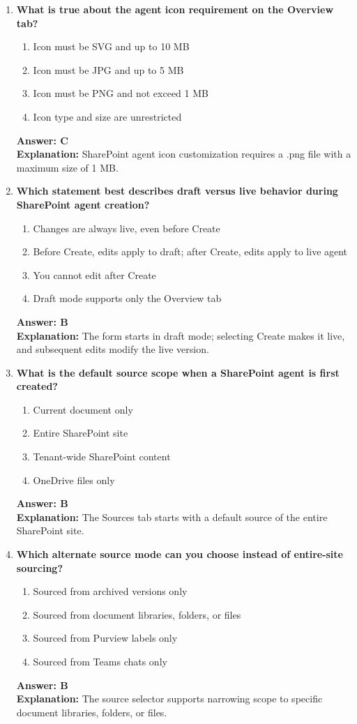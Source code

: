 \documentclass[10pt]{article}
\begin{document}
\begin{enumerate}[leftmargin=*]
\item \textbf{What is true about the agent icon requirement on the Overview tab?}
\begin{enumerate}[label=\Alph*.]
  \item Icon must be SVG and up to 10 MB
  \item Icon must be JPG and up to 5 MB
  \item Icon must be PNG and not exceed 1 MB
  \item Icon type and size are unrestricted
\end{enumerate}
\textbf{Answer: C}\\
\textbf{Explanation:} SharePoint agent icon customization requires a .png file with a maximum size of 1 MB.

\item \textbf{Which statement best describes draft versus live behavior during SharePoint agent creation?}
\begin{enumerate}[label=\Alph*.]
  \item Changes are always live, even before Create
  \item Before Create, edits apply to draft; after Create, edits apply to live agent
  \item You cannot edit after Create
  \item Draft mode supports only the Overview tab
\end{enumerate}
\textbf{Answer: B}\\
\textbf{Explanation:} The form starts in draft mode; selecting Create makes it live, and subsequent edits modify the live version.

\item \textbf{What is the default source scope when a SharePoint agent is first created?}
\begin{enumerate}[label=\Alph*.]
  \item Current document only
  \item Entire SharePoint site
  \item Tenant-wide SharePoint content
  \item OneDrive files only
\end{enumerate}
\textbf{Answer: B}\\
\textbf{Explanation:} The Sources tab starts with a default source of the entire SharePoint site.

\item \textbf{Which alternate source mode can you choose instead of entire-site sourcing?}
\begin{enumerate}[label=\Alph*.]
  \item Sourced from archived versions only
  \item Sourced from document libraries, folders, or files
  \item Sourced from Purview labels only
  \item Sourced from Teams chats only
\end{enumerate}
\textbf{Answer: B}\\
\textbf{Explanation:} The source selector supports narrowing scope to specific document libraries, folders, or files.


\end{enumerate}
\end{document}

